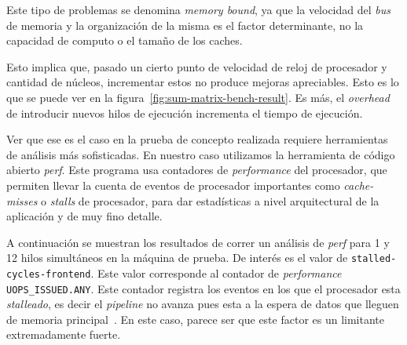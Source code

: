 Este tipo de problemas se denomina \textit{memory bound}, ya que la velocidad del
\textit{bus} de memoria y la organizaci\'on de la misma es el factor determinante,
no la capacidad de computo o el tama\~no de los caches.

Esto implica que, pasado un cierto punto de velocidad de reloj de procesador y
cantidad de n\'ucleos, incrementar estos no produce mejoras apreciables. Esto es
lo que se puede ver en la figura~\ref{fig:sum-matrix-bench-result}. Es m\'as, el
\textit{overhead} de introducir nuevos hilos de ejecuci\'on incrementa el tiempo
de ejecuci\'on.

Ver que ese es el caso en la prueba de concepto realizada requiere herramientas
de an\'alisis m\'as sofisticadas. En nuestro caso utilizamos la herramienta de
c\'odigo abierto \textit{perf}. Este programa usa contadores de
\textit{performance} del procesador, que permiten llevar la cuenta de eventos de procesador
importantes como \textit{cache-misses} o \textit{stalls} de procesador, para dar estad\'isticas
a nivel arquitectural de la aplicaci\'on y de muy fino detalle.

A continuaci\'on se muestran los resultados de correr
un an\'alisis de \textit{perf} para 1 y 12 hilos simult\'aneos en la m\'aquina de
prueba. De inter\'es es el valor de \texttt{stalled-cycles-frontend}. Este valor
corresponde al contador de \textit{performance} \texttt{UOPS\_ISSUED.ANY}. Este
contador registra los eventos en los que el procesador esta \textit{stalleado},
es decir el \textit{pipeline } no avanza pues esta a la espera de datos que
lleguen de memoria principal~\cite{Intel3B}. En este
caso, parece ser que este factor es un limitante extremadamente fuerte.

